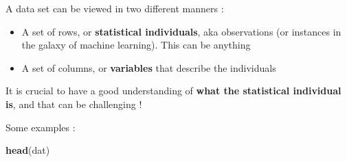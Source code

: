 \documentclass[
]{book}
\newenvironment{Shaded}{\begin{snugshade}}{\end{snugshade}}
\newcommand{\KeywordTok}[1]{\textcolor[rgb]{0.13,0.29,0.53}{\textbf{#1}}}
\newcommand{\NormalTok}[1]{#1}
\begin{document}
A data set can be viewed in two different manners :

\begin{itemize}
\item
  A set of rows, or \textbf{statistical individuals}, aka observations (or instances in the galaxy of machine learning). This can be anything
\item
  A set of columns, or \textbf{variables} that describe the individuals
\end{itemize}

It is crucial to have a good understanding of \textbf{what the statistical individual is}, and that can be challenging !

Some examples :

\begin{Shaded}
\begin{Highlighting}[]
\KeywordTok{head}\NormalTok{(dat)}
\end{Highlighting}
\end{Shaded}
\end{document}
